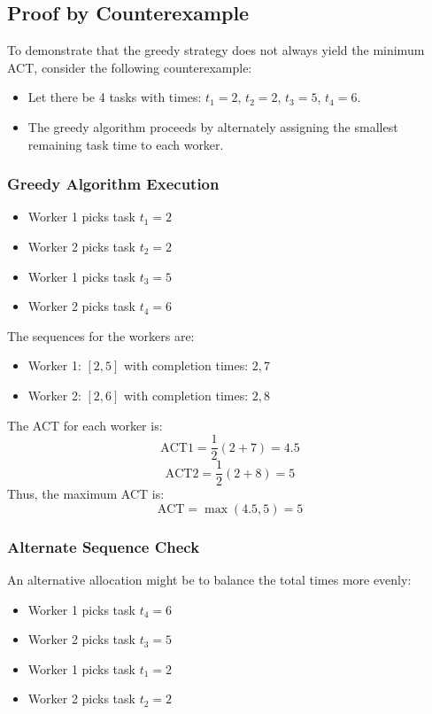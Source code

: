 \documentclass{article}
\begin{document}
\subsection*{Proof by Counterexample}

To demonstrate that the greedy strategy does not always yield the minimum ACT, consider the following counterexample:

\begin{itemize}
    \item Let there be 4 tasks with times: \( t_1 = 2 \), \( t_2 = 2 \), \( t_3 = 5 \), \( t_4 = 6 \).
    \item The greedy algorithm proceeds by alternately assigning the smallest remaining task time to each worker.
\end{itemize}

\subsubsection*{Greedy Algorithm Execution}
\begin{itemize}
    \item Worker 1 picks task \( t_1 = 2 \)
    \item Worker 2 picks task \( t_2 = 2 \)
    \item Worker 1 picks task \( t_3 = 5 \)
    \item Worker 2 picks task \( t_4 = 6 \)
\end{itemize}

The sequences for the workers are:
\begin{itemize}
    \item Worker 1: \( [2, 5] \) with completion times: \( 2, 7 \)
    \item Worker 2: \( [2, 6] \) with completion times: \( 2, 8 \)
\end{itemize}

The ACT for each worker is:
\[
\text{ACT1} = \frac{1}{2} (2 + 7) = 4.5
\]
\[
\text{ACT2} = \frac{1}{2} (2 + 8) = 5
\]
Thus, the maximum ACT is:
\[
\text{ACT} = \max(4.5, 5) = 5
\]

\subsubsection*{Alternate Sequence Check}
An alternative allocation might be to balance the total times more evenly:
\begin{itemize}
    \item Worker 1 picks task \( t_4 = 6 \)
    \item Worker 2 picks task \( t_3 = 5 \)
    \item Worker 1 picks task \( t_1 = 2 \)
    \item Worker 2 picks task \( t_2 = 2 \)
\end{itemize}
\end{document}
